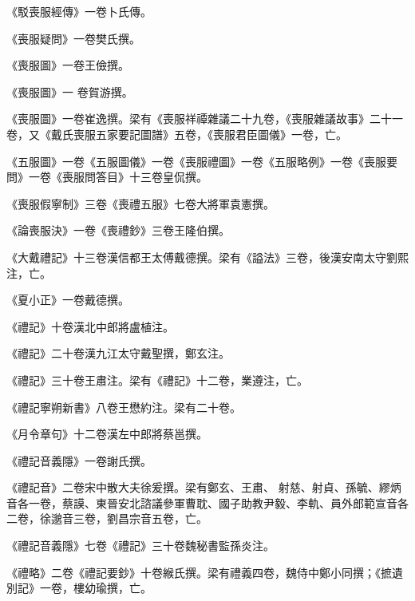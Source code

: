 \begin{pinyinscope}
 《駁喪服經傳》一卷卜氏傳。



 《喪服疑問》一卷樊氏撰。



 《喪服圖》一卷王儉撰。



 《喪服圖》一
 卷賀游撰。



 《喪服圖》一卷崔逸撰。梁有《喪服祥禫雜議二十九卷，《喪服雜議故事》二十一卷，又《戴氏喪服五家要記圖譜》五卷，《喪服君臣圖儀》一卷，亡。



 《五服圖》一卷《五服圖儀》一卷《喪服禮圖》一卷《五服略例》一卷《喪服要問》一卷《喪服問答目》十三卷皇侃撰。



 《喪服假寧制》三卷《喪禮五服》七卷大將軍袁憲撰。



 《論喪服決》一卷《喪禮鈔》三卷王隆伯撰。



 《大戴禮記》十三卷漢信都王太傅戴德撰。梁有《謚法》三卷，後漢安南太守劉熙注，亡。



 《夏小正》一卷戴德撰。



 《禮記》十卷漢北中郎將盧植注。



 《禮記》二十卷漢九江太守戴聖撰，鄭玄注。



 《禮記》三十卷王肅注。梁有《禮記》十二卷，業遵注，亡。



 《禮記寧朔新書》八卷王懋約注。梁有二十卷。



 《月令章句》十二卷漢左中郎將蔡邕撰。



 《禮記音義隱》一卷謝氏撰。



 《禮記音》二卷宋中散大夫徐爰撰。梁有鄭玄、王肅、
 射慈、射貞、孫毓、繆炳音各一卷，蔡謨、東晉安北諮議參軍曹耽、國子助教尹毅、李軌、員外郎範宣音各二卷，徐邈音三卷，劉昌宗音五卷，亡。



 《禮記音義隱》七卷《禮記》三十卷魏秘書監孫炎注。



 《禮略》二卷《禮記要鈔》十卷緱氏撰。梁有禮義四卷，魏侍中鄭小同撰；《摭遺別記》一卷，樓幼瑜撰，亡。




\end{pinyinscope}
